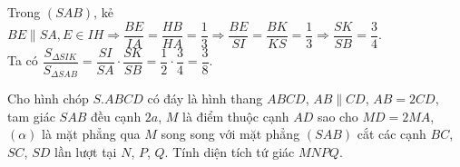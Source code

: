 \begin{bt}
\begin{bt}
{{}
	Trong $( SAB )$, kẻ $BE\parallel SA,E\in IH\Rightarrow \dfrac{BE}{IA}=\dfrac{HB}{HA}=\dfrac{1}{3}\Rightarrow \dfrac{BE}{SI}=\dfrac{BK}{KS}=\dfrac{1}{3}\Rightarrow \dfrac{SK}{SB}=\dfrac{3}{4}$. \\
Ta có $\dfrac{S_{\Delta SIK}}{{S_{\Delta SAB}}}=\dfrac{SI}{SA}\cdot\dfrac{SK}{SB}=\dfrac{1}{2}\cdot\dfrac{3}{4}=\dfrac{3}{8}$.
}
\end{bt}

\begin{bt} %
Cho hình chóp $S.ABCD$ có đáy là hình thang $ABCD$, $AB\parallel CD$, $AB=2CD$, tam giác $SAB$ đều cạnh $2a$, $M$ là điểm thuộc cạnh $AD$ sao cho $MD=2MA$, $( \alpha )$ là mặt phẳng qua $M$ song song với mặt phẳng $( SAB )$ cắt các cạnh $BC$, $SC$, $SD$ lần lượt tại $N$, $P$, $Q$. Tính diện tích tứ giác $MNPQ$.


\end{bt}
\end{bt}
